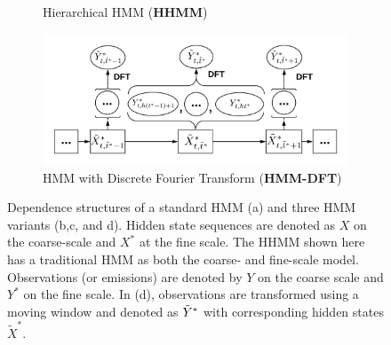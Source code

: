 \begin{figure}[ht]
\begin{subfigure}{\textwidth}
      \caption{Hierarchical HMM (\textbf{HHMM})}
      \label{fig:HHMM}
    \end{subfigure}
    \newline
    \begin{subfigure}{\textwidth}
      \centering
      \includegraphics[width=4in]{../Plots/HMM-DFT.png}  
      \caption{HMM with Discrete Fourier Transform (\textbf{HMM-DFT})}
      \label{fig:HMM-DFT}
    \end{subfigure}
    \caption{Dependence structures of a standard HMM (a) and three HMM variants (b,c, and d). Hidden state sequences are denoted as $X$ on the coarse-scale and $X^*$ at the fine scale. The HHMM shown here has a traditional HMM as both the coarse- and fine-scale model. Observations (or emissions) are denoted by $Y$ on the coarse scale and $Y^*$ on the fine scale. In (d), observations are transformed using a moving window and denoted as $\tilde{Y}^*$ with corresponding hidden states $\tilde X^*$.}
    \label{fig:models}
\end{figure}


